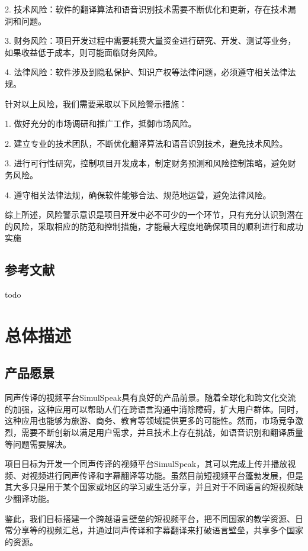 2. 技术风险：软件的翻译算法和语音识别技术需要不断优化和更新，存在技术漏洞和问题。

3. 财务风险：项目开发过程中需要耗费大量资金进行研究、开发、测试等业务，如果收益低于成本，则可能面临财务风险。

4. 法律风险：软件涉及到隐私保护、知识产权等法律问题，必须遵守相关法律法规。

   针对以上风险，我们需要采取以下风险警示措施：
   
1. 做好充分的市场调研和推广工作，抵御市场风险。

2. 建立专业的技术团队，不断优化翻译算法和语音识别技术，避免技术风险。

3. 进行可行性研究，控制项目开发成本，制定财务预测和风险控制策略，避免财务风险。

4. 遵守相关法律法规，确保软件能够合法、规范地运营，避免法律风险。

   综上所述，风险警示意识是项目开发中必不可少的一个环节，只有充分认识到潜在的风险，采取相应的防范和控制措施，才能最大程度地确保项目的顺利进行和成功实施

\section{参考文献}


todo


\newpage


\chapter{总体描述}
\label{ch:Overall Description}

\section{产品愿景}

同声传译的视频平台SimulSpeak具有良好的产品前景。随着全球化和跨文化交流的加强，这种应用可以帮助人们在跨语言沟通中消除障碍，扩大用户群体。同时，这种应用也能够为旅游、商务、教育等领域提供更多的可能性。然而，市场竞争激烈，需要不断创新以满足用户需求，并且技术上存在挑战，如语音识别和翻译质量等问题需要解决。

项目目标为开发一个同声传译的视频平台SimulSpeak，其可以完成上传并播放视频、对视频进行同声传译和字幕翻译等功能。虽然目前短视频平台蓬勃发展，但是其大多只是用于某个国家或地区的学习或生活分享，并且对于不同语言的短视频缺少翻译功能。

鉴此，我们目标搭建一个跨越语言壁垒的短视频平台，把不同国家的教学资源、日常分享等的视频汇总，并通过同声传译和字幕翻译来打破语言壁垒，共享多个国家的资源。

